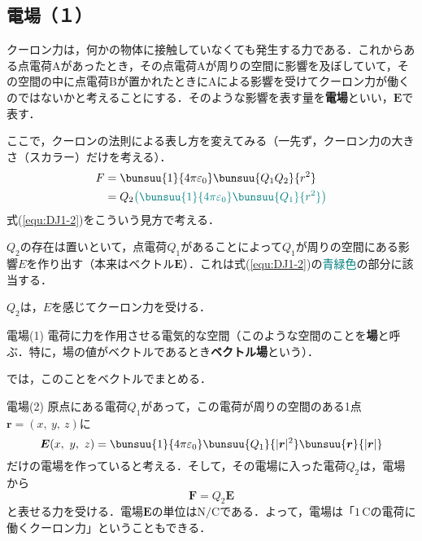 \subsection{電場（１）}

クーロン力は，何かの物体に接触していなくても発生する力である．これからある点電荷Aがあったとき，その点電荷Aが周りの空間に影響を及ぼしていて，その空間の中に点電荷Bが置かれたときにAによる影響を受けてクーロン力が働くのではないかと考えることにする．そのような影響を表す量を\textbf{電場}といい，$\bm{E}$で表す．

ここで，クーロンの法則による表し方を変えてみる（一先ず，クーロン力の大きさ（スカラー）だけを考える）．
\begin{align}
	F &= \bunsuu{1}{4\pi\varepsilon_0}\bunsuu{Q_1 Q_2}{r^2} \notag\\
	&= Q_2 {\color{teal}\left(\bunsuu{1}{4\pi\varepsilon_0}\bunsuu{Q_1}{r^2}\right)} \label{equ:DJ1-2}
\end{align}
式(\ref{equ:DJ1-2})をこういう見方で考える．
\begin{enumerate}[label=\textbf{[\arabic*]}, labelsep=10pt, leftmargin=23pt]
	\item $Q_2$の存在は置いといて，点電荷$Q_1$があることによって$Q_1$が周りの空間にある影響$E$を作り出す（本来はベクトル$\bm{E}$）．これは式(\ref{equ:DJ1-2})の\textcolor{teal}{青緑色}の部分に該当する．
	\item $Q_2$は，$E$を感じてクーロン力を受ける．
\end{enumerate}

\begin{kousiki}{電場(1)}
	電荷に力を作用させる電気的な空間（このような空間のことを\textbf{場}と呼ぶ．特に，場の値がベクトルであるとき\textbf{ベクトル場}という）．
\end{kousiki}

では，このことをベクトルでまとめる．

\begin{kousiki}{電場(2)}
	原点にある電荷$Q_1$があって，この電荷が周りの空間のある1点$\bm{r} = (x,\ y,\ z)$に
	\begin{equation}
		\bm{E}(x,\ y,\ z) = \bunsuu{1}{4\pi\varepsilon_0}\bunsuu{Q_1}{|\bm{r}|^2}\bunsuu{\bm{r}}{|\bm{r}|} \label{equ:DJ1-3}
	\end{equation}
	だけの電場を作っていると考える．そして，その電場に入った電荷$Q_2$は，電場から
	\begin{equation}
		\bm{F} = Q_2 \bm{E}
	\end{equation}
	と表せる力を受ける．電場$\bm{E}$の単位は$\mathrm{N/C}$である．よって，電場は「$1\,\mathrm{C}$の電荷に働くクーロン力」ということもできる．
\end{kousiki}

